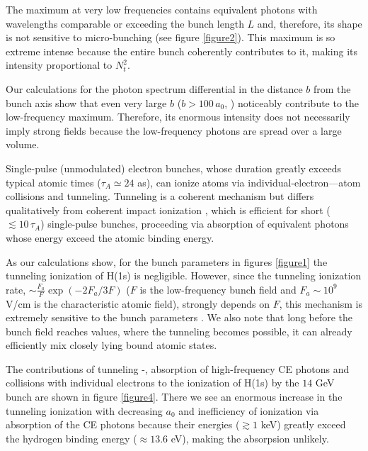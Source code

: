 \documentclass[prl, twocolumn, floatfix]{revtex4}
\begin{document}
\vspace{0.15cm}

The maximum at very low frequencies
contains equivalent
photons with wavelengths
comparable or exceeding the bunch length $L$ and, therefore,
its shape \cite{1bunch} is not sensitive to micro-bunching
(see figure \ref{figure2}).
This maximum is so extreme intense because
the entire bunch coherently contributes to it,
making its intensity proportional to $N_t^2$.

Our calculations for the photon spectrum differential in
the distance $b$ from the bunch axis show that
even very large $b$ ($b > 100 \, a_0$, \cite{vacuum-chamber}) noticeably contribute
to the low-frequency maximum. Therefore, its enormous intensity
does not necessarily imply
strong fields because the low-frequency photons
are spread over a large volume.

Single-pulse (unmodulated) electron bunches, whose duration greatly exceeds
typical atomic times
($ \tau_A \simeq 24 $ as),
can ionize atoms via
individual-electron---atom collisions and tunneling.
Tunneling is a coherent mechanism
but differs qualitatively from coherent impact ionization \cite{we-2025},
which is efficient for short ($ \lesssim  10 \, \tau_A$)
single-pulse bunches, proceeding
via absorption of equivalent photons whose energy exceed
the atomic binding energy.

As our calculations show,
for the bunch parameters in figures \ref{figure1}
the tunneling ionization of H(1s) is negligible.
However, since the tunneling ionization rate,
$\sim \frac{F_a}{F} \exp(-2 F_a / 3 F) $ \cite{LL-III}
($F$ is the low-frequency bunch field and $F_a \sim 10^9$ V/cm
is the characteristic atomic field), strongly depends on $F$,
this mechanism is extremely sensitive to
the bunch parameters \cite{we-2025}.
We also note that long before the bunch field reaches values,
where the tunneling becomes possible,
it can already efficiently mix closely lying bound atomic states.

The contributions of tunneling \cite{tun1}-\cite{tun2},
absorption of high-frequency CE photons
and collisions with individual electrons to the ionization of H(1s) by the $14$ GeV
bunch are shown in figure \ref{figure4}. There we see an enormous increase
in the tunneling ionization with decreasing $a_0$ and
inefficiency of ionization via absorption
of the CE photons because
their energies ($ \gtrsim 1 $ keV) greatly exceed the hydrogen
binding energy ($\approx 13.6$ eV), making the absorpsion unlikely.
\end{document}
